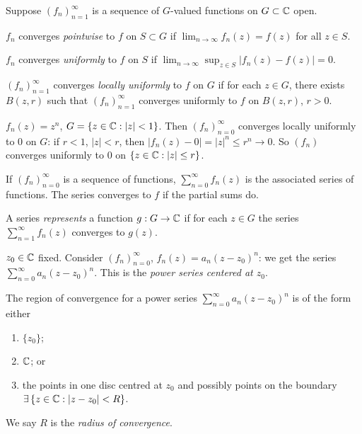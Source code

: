 \documentclass[11pt]{article}
\begin{document}
Suppose $(f_n)_{n=1}^\infty$ is a sequence of $G$-valued functions on $G \subset {\mathbb{C}}$ open.

\begin{definition}
$f_n$ converges \emph{pointwise} to $f$ on $S \subset G$ if $\lim_{n\to\infty} f_n(z) = f(z)$ for all $z \in S$.
\end{definition}

\begin{definition}
$f_n$ converges \emph{uniformly} to $f$ on $S$ if $\lim_{n\to\infty} \sup_{z\in S} |f_n(z)-f(z)| = 0$.
\end{definition}

\begin{definition}
$(f_n)_{n=1}^\infty$ converges \emph{locally uniformly} to $f$ on $G$ if for each $z \in G$, there exists $B(z,r)$ such that $(f_n)_{n=1}^\infty$ converges uniformly to $f$ on $B(z,r)$, $r>0$.
\end{definition}

\begin{example}
$f_n(z) = z^n$, $G = \{z \in {\mathbb{C}} : |z| < 1\}$. Then $(f_n)_{n=0}^\infty$ converges locally uniformly to $0$ on $G$: if $r<1$, $|z|<r$, then $|f_n(z)-0| = |z|^n \le r^n \to 0$. So $(f_n)$ converges uniformly to $0$ on $\{z \in {\mathbb{C}} : |z| \le r\}$.
\end{example}

If $(f_n)_{n=0}^\infty$ is a sequence of functions, $\sum_{n=0}^\infty f_n(z)$ is the associated series of functions. The series converges to $f$ if the partial sums do.

A series \emph{represents} a function $g: G \to {\mathbb{C}}$ if for each $z \in G$ the series $\sum_{n=1}^\infty f_n(z)$ converges to $g(z)$.

\begin{example}
$z_0 \in {\mathbb{C}}$ fixed. Consider $(f_n)_{n=0}^\infty$, $f_n(z) = a_n(z-z_0)^n$: we get the series $\sum_{n=0}^\infty a_n(z-z_0)^n$. This is the \emph{power series centered at $z_0$}.
\end{example}

\begin{proposition}
The region of convergence for a power series $\sum_{n=0}^\infty a_n(z-z_0)^n$ is of the form either
\begin{enumerate}[label=(\alph*)]
    \item $\{z_0\}$;
    \item ${\mathbb{C}}$; or
    \item the points in one disc centred at $z_0$ and possibly points on the boundary $\exists\, \{z \in {\mathbb{C}} : |z-z_0| < R\}$.
\end{enumerate}
We say $R$ is the \emph{radius of convergence}.
\end{proposition}
\end{document}
